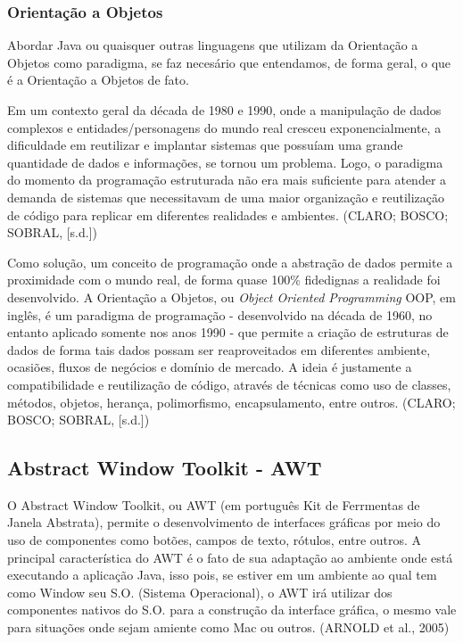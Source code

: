 \documentclass[a4paper,12pt]{article}
\begin{document}
\subsubsection{Orientação a Objetos}
Abordar Java ou quaisquer outras linguagens que utilizam da Orientação a Objetos como paradigma, se faz necesário que entendamos, de forma geral,
o que é a Orientação a Objetos de fato.

Em um contexto geral da década de 1980 e 1990, onde a manipulação de dados complexos e entidades/personagens do mundo real cresceu exponencialmente,
a dificuldade em reutilizar e implantar sistemas que possuíam uma grande quantidade de dados e informações, se tornou um problema. Logo, o paradigma do momento 
da programação estruturada não era mais suficiente para atender a demanda de sistemas que necessitavam de uma maior organização e reutilização de código 
para replicar em diferentes realidades e ambientes. (CLARO; BOSCO; SOBRAL, [s.d.])

Como solução, um conceito de programação onde a abstração de dados permite a proximidade com o mundo real, de forma quase 100\% fidedignas a realidade foi desenvolvido.
A Orientação a Objetos, ou \textit{Object Oriented Programming} OOP, em inglês, é um paradigma de programação - desenvolvido na década de 1960, no entanto aplicado somente 
nos anos 1990 - que permite a criação de estruturas de dados de forma tais dados possam ser reaproveitados em diferentes 
ambiente, ocasiões, fluxos de negócios e domínio de mercado. A ideia é justamente a compatibilidade e reutilização de código,
através de técnicas como uso de classes, métodos, objetos, herança, polimorfismo, encapsulamento, entre outros. (CLARO; BOSCO; SOBRAL, [s.d.])


\subsection{Abstract Window Toolkit - AWT}
O Abstract Window Toolkit, ou AWT (em português Kit de Ferrmentas de Janela Abstrata), permite o desenvolvimento de interfaces gráficas por 
meio do uso de componentes como botões, campos de texto, rótulos, entre outros. A principal característica do AWT é o fato de sua adaptação ao 
ambiente onde está executando a aplicação Java, isso pois, se estiver em um ambiente ao qual tem como Window seu S.O. (Sistema Operacional),
o AWT irá utilizar dos componentes nativos do S.O. para a construção da interface gráfica, o mesmo vale para situações onde sejam amiente como Mac ou outros.
(ARNOLD et al., 2005)
\end{document}
